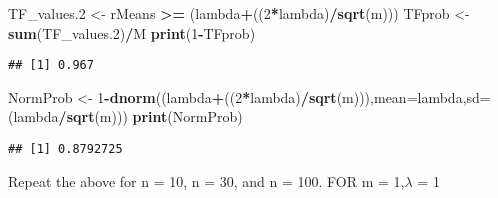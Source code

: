 \documentclass[
]{article}
\newenvironment{Shaded}{\begin{snugshade}}{\end{snugshade}}
\newcommand{\DataTypeTok}[1]{\textcolor[rgb]{0.13,0.29,0.53}{#1}}
\newcommand{\DecValTok}[1]{\textcolor[rgb]{0.00,0.00,0.81}{#1}}
\newcommand{\FloatTok}[1]{\textcolor[rgb]{0.00,0.00,0.81}{#1}}
\newcommand{\KeywordTok}[1]{\textcolor[rgb]{0.13,0.29,0.53}{\textbf{#1}}}
\newcommand{\NormalTok}[1]{#1}
\newcommand{\OperatorTok}[1]{\textcolor[rgb]{0.81,0.36,0.00}{\textbf{#1}}}
\newcommand{\StringTok}[1]{\textcolor[rgb]{0.31,0.60,0.02}{#1}}
\begin{document}
\begin{Shaded}
\begin{Highlighting}[]
\NormalTok{TF_values}\FloatTok{.2}\NormalTok{ <-}\StringTok{ }\NormalTok{rMeans }\OperatorTok{>=}\StringTok{ }\NormalTok{(lambda}\OperatorTok{+}\NormalTok{((}\DecValTok{2}\OperatorTok{*}\NormalTok{lambda)}\OperatorTok{/}\KeywordTok{sqrt}\NormalTok{(m)))}
\NormalTok{TFprob <-}\StringTok{ }\KeywordTok{sum}\NormalTok{(TF_values}\FloatTok{.2}\NormalTok{)}\OperatorTok{/}\NormalTok{M}
\KeywordTok{print}\NormalTok{(}\DecValTok{1}\OperatorTok{-}\NormalTok{TFprob)}
\end{Highlighting}
\end{Shaded}

\begin{verbatim}
## [1] 0.967
\end{verbatim}

\begin{Shaded}
\begin{Highlighting}[]
\NormalTok{NormProb <-}\StringTok{ }\DecValTok{1}\OperatorTok{-}\KeywordTok{dnorm}\NormalTok{((lambda}\OperatorTok{+}\NormalTok{((}\DecValTok{2}\OperatorTok{*}\NormalTok{lambda)}\OperatorTok{/}\KeywordTok{sqrt}\NormalTok{(m))),}\DataTypeTok{mean=}\NormalTok{lambda,}\DataTypeTok{sd=}\NormalTok{(lambda}\OperatorTok{/}\KeywordTok{sqrt}\NormalTok{(m)))}
\KeywordTok{print}\NormalTok{(NormProb)}
\end{Highlighting}
\end{Shaded}

\begin{verbatim}
## [1] 0.8792725
\end{verbatim}

Repeat the above for n = 10, n = 30, and n = 100. FOR m = 1,\(\lambda\)
= 1
\end{document}
